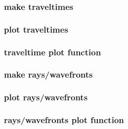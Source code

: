 
\begin{frame} \frametitle{make traveltimes}
\end{frame}
\cwpnote{}

\begin{frame} \frametitle{plot traveltimes}
\end{frame}
\cwpnote{}

\begin{frame} \frametitle{traveltime plot function}
\end{frame}
\cwpnote{}

\begin{frame}
\end{frame}
\cwpnote{}


\begin{frame} \frametitle{make rays/wavefronts}
\end{frame}
\cwpnote{}

\begin{frame} \frametitle{plot rays/wavefronts}
\end{frame}
\cwpnote{}

\begin{frame} \frametitle{rays/wavefronts plot function}
\end{frame}
\cwpnote{}

\begin{frame}
\end{frame}
\cwpnote{}

\begin{frame}

  
  \vfill


  \vfill
  
  \begin{center}
  \end{center}
  
\end{frame}
\cwpnote{}
